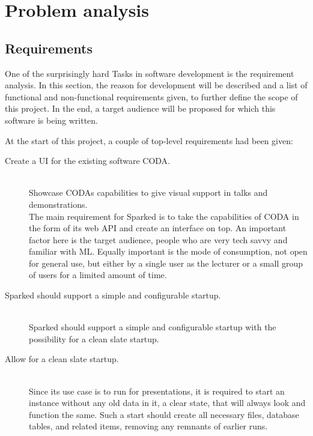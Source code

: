 \chapter{Problem analysis}

\section{Requirements}

One of the surprisingly hard Tasks in software development is the requirement analysis. In this section, the reason for development will be described and a list of functional and non-functional requirements given, to further define the scope of this project. In the end, a target audience will be proposed for which this software is being written. 

At the start of this project, a couple of top-level requirements had been given:

\begin{description}
\item[Create a UI for the existing software CODA.]\hfill \\
Showcase CODAs capabilities to give visual support in talks and demonstrations.\\
The main requirement for Sparked is to take the capabilities of CODA in the form of its web API and create an interface on top. An important factor here is the target audience, people who are very tech savvy and familiar with ML. Equally important is the mode of consumption, not open for general use, but either by a single user as the lecturer or a small group of users for a limited amount of time. 
\end{description}

\begin{description}
\item [Sparked should support a simple and configurable startup.]\hfill \\
Sparked should support a simple and configurable startup with the possibility for a clean slate startup.

\item [Allow for a clean slate startup.]\hfill \\
Since its use case is to run for presentations, it is required to start an instance without any old data in it, a clear state, that will always look and function the same. Such a start should create all necessary files, database tables, and related items, removing any remnants of earlier runs.
\end{description}

